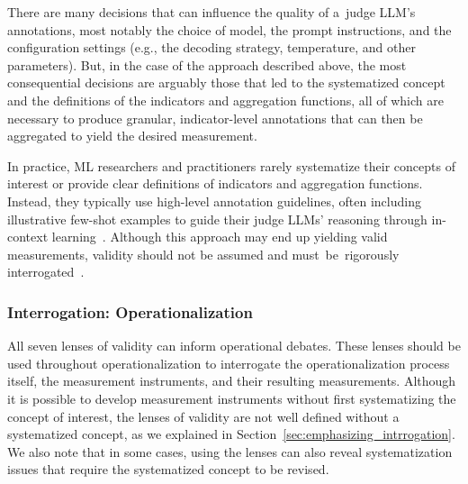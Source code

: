 \documentclass{article}
\begin{document}
There are many decisions that can influence the quality of a~judge LLM's annotations, most notably the choice of model, the prompt instructions, and the configuration settings (e.g., the decoding strategy, temperature, and other parameters). But, in the case of the approach described above, the most consequential decisions are arguably those that led to the systematized concept and the definitions of the indicators and aggregation functions, all of which are necessary to produce granular, indicator-level annotations that can then be aggregated to yield the desired measurement.

In practice, ML researchers and practitioners rarely systematize their concepts of interest or provide clear definitions of indicators and aggregation functions. Instead, they typically use high-level annotation guidelines, often including illustrative few-shot examples to guide their judge LLMs' reasoning through in-context learning~\cite{brown2020language}. Although this approach may end up yielding valid measurements, validity should not be assumed and must~be~rigorously interrogated~\cite{pangakis2024keeping}.

\subsubsection{Interrogation: Operationalization}
\label{sec:operationalization_interrogation}

All seven lenses of validity can inform operational debates. These lenses should be used throughout operationalization to interrogate the operationalization process itself, the measurement instruments, and their resulting measurements. Although it is possible to develop measurement instruments without first systematizing the concept of interest, the lenses of validity are not well defined without a systematized concept, as we explained in Section~\ref{sec:emphasizing_intrrogation}. We also note that in some cases, using the lenses can also reveal systematization issues that require the systematized concept to be revised.
\end{document}
